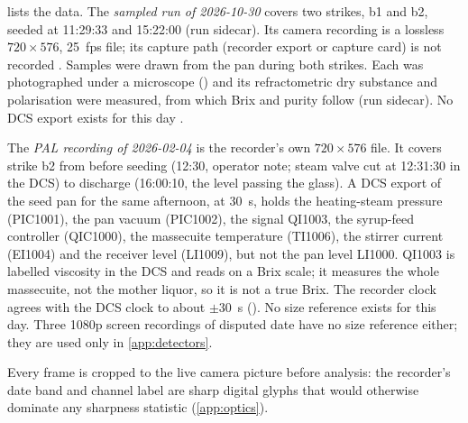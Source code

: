  lists the data. The \emph{sampled run of 2026-10-30} covers two strikes, b1 and b2, seeded at
11:29:33 and 15:22:00 (run sidecar). Its camera recording is a lossless $720 \times 576$, 25~fps file; its capture
path (recorder export or capture card) is not recorded .
Samples were drawn from the pan during both strikes. Each was photographed under a microscope ()
and its refractometric dry substance and polarisation were measured, from which Brix and purity follow (run
sidecar). No DCS export exists for this day .

The \emph{PAL recording of 2026-02-04} is the recorder's own $720 \times 576$ file. It covers strike b2 from before
seeding (12:30, operator note; steam valve cut at 12:31:30 in the DCS) to discharge (16:00:10, the level passing the
glass). A DCS export of the seed pan for the same afternoon, at 30~s, holds the heating-steam pressure (PIC1001), the
pan vacuum (PIC1002), the signal QI1003, the syrup-feed controller (QIC1000), the massecuite temperature (TI1006),
the stirrer current (EI1004) and the receiver level (LI1009), but not the pan level LI1000. QI1003 is labelled
viscosity in the DCS and reads on a Brix scale; it measures the whole massecuite, not the mother liquor, so it is not
a true Brix. The recorder clock agrees with the DCS clock to about $\pm 30$~s (). No
size reference exists for this day. Three 1080p screen recordings of disputed date have no size reference either;
they are used only in \ref{app:detectors}.

Every frame is cropped to the live camera picture before analysis: the recorder's date band and channel label are
sharp digital glyphs that would otherwise dominate any sharpness statistic (\ref{app:optics}).

